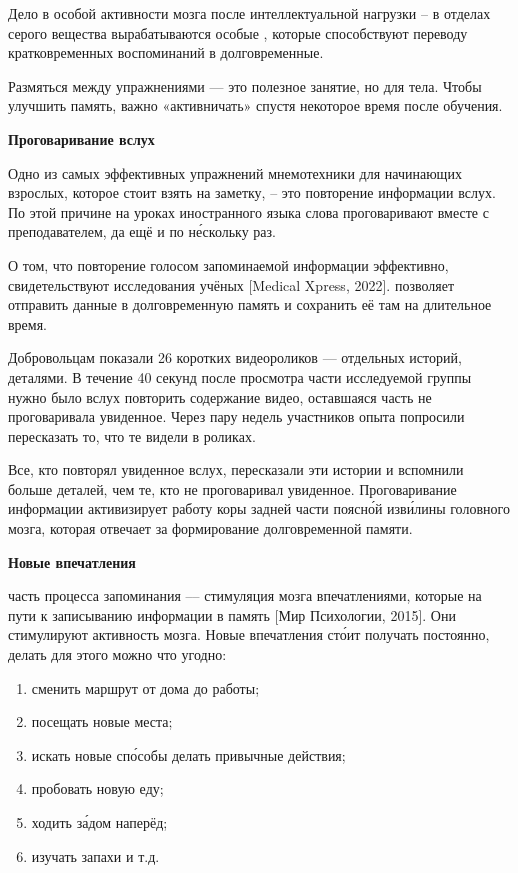 Дело в особой активности мозга после интеллектуальной нагрузки – в отделах серого вещества вырабатываются особые , которые способствуют переводу кратковременных воспоминаний в долговременные.

Размяться между упражнениями --- это полезное занятие, но для тела. Чтобы улучшить память, важно «активничать» спустя некоторое время после обучения.

\textbf{Проговаривание вслух}

Одно из самых эффективных упражнений мнемотехники для начинающих взрослых, которое стоит взять на заметку, – это повторение информации вслух. По этой причине на уроках иностранного языка слова проговаривают вместе с преподавателем, да ещё и по н\'{е}скольку раз.

О том, что повторение голосом запоминаемой информации эффективно, свидетельствуют исследования учёных [Medical Xpress, 2022].  позволяет отправить данные в долговременную память и сохранить её там на длительное время.

Добровольцам показали 26 коротких видеороликов --- отдельных историй,  деталями. В течение 40 секунд после просмотра части исследуемой группы нужно было вслух повторить содержание видео, оставшаяся часть не проговаривала увиденное. Через пару недель участников опыта попросили пересказать то, что те видели в роликах.

Все, кто повторял увиденное вслух,  пересказали эти истории и вспомнили больше деталей, чем те, кто не проговаривал увиденное. Проговаривание информации активизирует работу коры задней части поясн\'{о}й изв\'{и}лины головного мозга, которая отвечает за формирование долговременной памяти.


\textbf{Новые впечатления}

 часть процесса запоминания --– стимуляция мозга впечатлениями, которые  на пути к записыванию информации в память [Мир Психологии, 2015]. Они стимулируют активность мозга. Новые впечатления ст\'{о}ит получать постоянно, делать для этого можно что угодно:
\begin{enumerate}
    \item сменить маршрут от дома до работы;
    \item посещать новые места;
    \item искать новые сп\'{о}собы делать привычные действия;
    \item пробовать новую еду;
    \item ходить з\'{а}дом наперёд;
    \item изучать запахи и т.д.
\end{enumerate}

